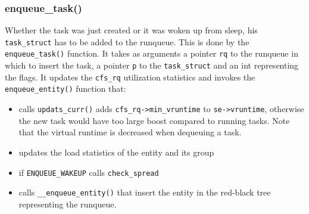 \subsubsection{enqueue\_task()}
Whether the task was just created or it was woken up from sleep, his \verb|task_struct| has to be added to the runqueue. This is done by the \verb|enqueue_task()| function. It takes as arguments a pointer \verb|rq| to the runqueue in which to insert the task, a pointer \verb|p| to the \verb|task_struct| and an int representing the flags. It updates the \verb|cfs_rq| utilization statistics and invokes the \verb|enqueue_entity()| function that:
\begin{itemize}
    \item calls \verb|updats_curr()| adds \verb|cfs_rq->min_vruntime| to \verb|se->vruntime|, otherwise the new task would have too large boost compared to running tasks. Note that the virtual runtime is decreased when dequeuing a task.
    \item updates the load statistics of the entity and its group
    \item if \verb|ENQUEUE_WAKEUP| calls \verb|check_spread|
    \item calls \verb|__enqueue_entity()| that insert the entity in the red-black tree representing the runqueue.
\end{itemize}



